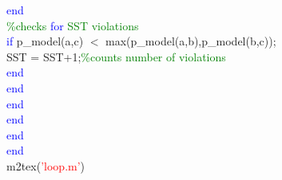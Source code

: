 \hspace{1mm}\indent \indent \indent \indent \indent \indent \indent \textcolor{blue}{end} \\ 
\hspace{1mm}\indent \indent \indent \indent \indent \indent \indent \textcolor{green}{\%checks \textcolor{blue}{for} SST violations }\\ 
\hspace{1mm}\indent \indent \indent \indent \indent \indent \indent \indent \textcolor{blue}{if} p\_model(a,c) $<$ max(p\_model(a,b),p\_model(b,c)); \\ 
\hspace{1mm}\indent \indent \indent \indent \indent \indent \indent \indent \indent SST = SST+1;\textcolor{green}{\%counts number of violations }\\ 
\hspace{1mm}\indent \indent \indent \indent \indent \indent \indent \indent \textcolor{blue}{end} \\ 
\hspace{1mm}\indent \indent \indent \indent \indent \indent \indent \textcolor{blue}{end} \\ 
\hspace{1mm}\indent \indent \indent \indent \indent \indent \textcolor{blue}{end} \\ 
\hspace{1mm}\indent \indent \indent \indent \indent \textcolor{blue}{end} \\ 
\hspace{1mm}\indent \indent \indent \indent \textcolor{blue}{end} \\ 
\hspace{1mm}\indent \indent \indent \textcolor{blue}{end} \\ 
\hspace{1mm}\indent \indent \indent m2tex(\textcolor{red}{'loop.m'}) \\ 
